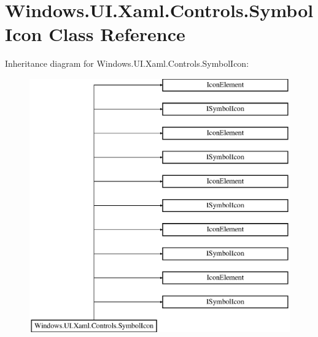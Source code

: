 \hypertarget{class_windows_1_1_u_i_1_1_xaml_1_1_controls_1_1_symbol_icon}{}\section{Windows.\+U\+I.\+Xaml.\+Controls.\+Symbol\+Icon Class Reference}
\label{class_windows_1_1_u_i_1_1_xaml_1_1_controls_1_1_symbol_icon}
Inheritance diagram for Windows.\+U\+I.\+Xaml.\+Controls.\+Symbol\+Icon\+:\begin{figure}[H]
\begin{center}
\leavevmode
\includegraphics[height=11.000000cm]{class_windows_1_1_u_i_1_1_xaml_1_1_controls_1_1_symbol_icon}
\end{center}
\end{figure}
